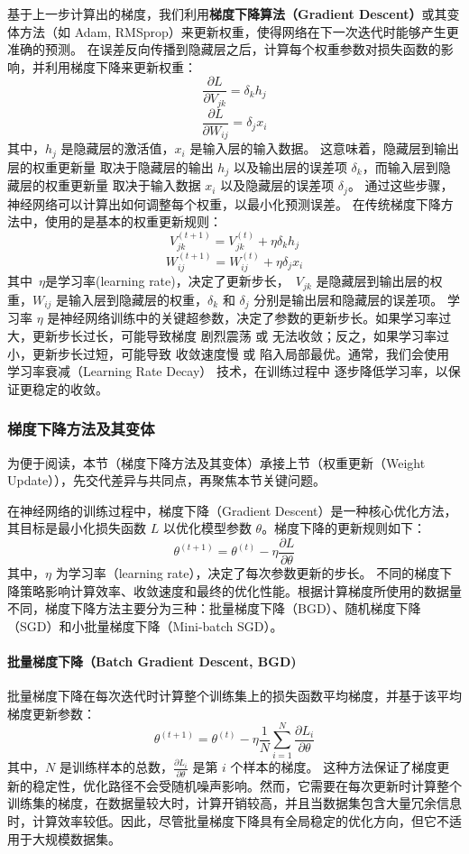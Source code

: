 基于上一步计算出的梯度，我们利用{\bf 梯度下降算法（Gradient Descent）}或其变体方法（如 Adam, RMSprop）来更新权重，使得网络在下一次迭代时能够产生更准确的预测。
{ 在误差反向传播到隐藏层之后，计算每个权重参数对损失函数的影响，并利用梯度下降来更新权重：
$$
 \frac{\partial L}{\partial V_{jk}}=\delta_k h_j
$$
$$
 \frac{\partial L}{\partial W_{ij}}=\delta_j x_i
$$
其中，$h_j$ 是隐藏层的激活值，$x_i$ 是输入层的输入数据。
这意味着，隐藏层到输出层的权重更新量 取决于隐藏层的输出 $h_j$ 以及输出层的误差项 $\delta_k$，而输入层到隐藏层的权重更新量 取决于输入数据 $x_i$ 以及隐藏层的误差项 $\delta_j$。
通过这些步骤，神经网络可以计算出如何调整每个权重，以最小化预测误差。}
在传统梯度下降方法中，使用的是基本的权重更新规则：
$$
V_{jk}^{(t+1)} =V_{jk}^{(t)} +\eta \delta_k h_j
$$
$$
W_{ij}^{(t+1)} =W_{ij}^{(t)} +\eta \delta_j x_i
$$
其中~$\eta$是学习率(learning rate)，决定了更新步长，~$V_{jk}$ 是隐藏层到输出层的权重，$ W_{ij} $ 是输入层到隐藏层的权重，$\delta_k$ 和 $\delta_j$ 分别是输出层和隐藏层的误差项。
学习率 $\eta$ 是神经网络训练中的关键超参数，决定了参数的更新步长。如果学习率过大，更新步长过长，可能导致梯度 剧烈震荡 或 无法收敛；反之，如果学习率过小，更新步长过短，可能导致 收敛速度慢 或 陷入局部最优。通常，我们会使用 学习率衰减（Learning Rate Decay） 技术，在训练过程中 逐步降低学习率，以保证更稳定的收敛。
\subsubsection*{梯度下降方法及其变体}
为便于阅读，本节（梯度下降方法及其变体）承接上节（权重更新（Weight Update）），先交代差异与共同点，再聚焦本节关键问题。

在神经网络的训练过程中，梯度下降（Gradient Descent）是一种核心优化方法，其目标是最小化损失函数 \( L \) 以优化模型参数 \( \theta \)。梯度下降的更新规则如下：
\begin{equation}
\theta^{(t+1)} = \theta^{(t)} - \eta \frac{\partial L}{\partial \theta}
\end{equation}
其中，\(\eta\) 为学习率（learning rate），决定了每次参数更新的步长。
不同的梯度下降策略影响计算效率、收敛速度和最终的优化性能。根据计算梯度所使用的数据量不同，梯度下降方法主要分为三种：批量梯度下降（BGD）、随机梯度下降（SGD）和小批量梯度下降（Mini-batch SGD）。
\paragraph*{批量梯度下降（Batch Gradient Descent, BGD)}
批量梯度下降在每次迭代时计算整个训练集上的损失函数平均梯度，并基于该平均梯度更新参数：
\begin{equation}
\theta^{(t+1)} = \theta^{(t)} - \eta \frac{1}{N} \sum_{i=1}^{N} \frac{\partial L_i}{\partial \theta}
\end{equation}
其中，\(N\) 是训练样本的总数，\(\frac{\partial L_i}{\partial \theta}\) 是第 \(i\) 个样本的梯度。
这种方法保证了梯度更新的稳定性，优化路径不会受随机噪声影响。然而，它需要在每次更新时计算整个训练集的梯度，在数据量较大时，计算开销较高，并且当数据集包含大量冗余信息时，计算效率较低。因此，尽管批量梯度下降具有全局稳定的优化方向，但它不适用于大规模数据集。
